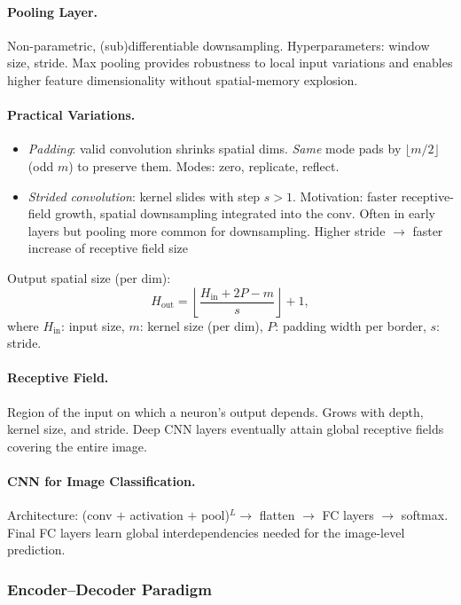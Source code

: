 \documentclass{article}
\begin{document}
\paragraph{Pooling Layer.}
Non-parametric, (sub)differentiable downsampling. Hyperparameters: window size, stride. Max pooling provides robustness to local input variations and enables higher feature dimensionality without spatial-memory explosion.

\paragraph{Practical Variations.}
\begin{itemize}
    \item \textit{Padding}: valid convolution shrinks spatial dims. \textit{Same} mode pads by $\lfloor m/2 \rfloor$ (odd $m$) to preserve them. Modes: zero, replicate, reflect.
    \item \textit{Strided convolution}: kernel slides with step $s>1$. Motivation: faster receptive-field growth, spatial downsampling integrated into the conv. Often in early layers but pooling more common for downsampling. Higher stride $\rightarrow$ faster increase of receptive field size
\end{itemize}
Output spatial size (per dim):
\begin{equation*}
    H_{\mathrm{out}} = \left\lfloor \frac{H_{\mathrm{in}} + 2P - m}{s} \right\rfloor + 1,
\end{equation*}
where $H_{\mathrm{in}}$: input size, $m$: kernel size (per dim), $P$: padding width per border, $s$: stride.

\paragraph{Receptive Field.}
Region of the input on which a neuron's output depends. Grows with depth, kernel size, and stride. Deep CNN layers eventually attain global receptive fields covering the entire image.

\paragraph{CNN for Image Classification.}
Architecture: (conv $+$ activation $+$ pool)$^L \to$ flatten $\to$ FC layers $\to$ softmax. Final FC layers learn global interdependencies needed for the image-level prediction.

\subsubsection{Encoder--Decoder Paradigm}
\end{document}
